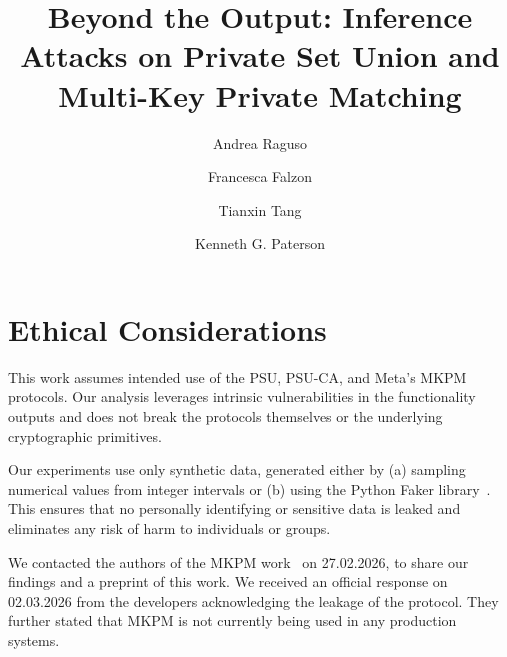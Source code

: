 \documentclass[sigconf,balance=false]{acmart}
\begin{document}
\title{Beyond the Output: Inference Attacks on Private Set Union and Multi-Key Private Matching}

\author{Andrea Raguso}

\author{Francesca Falzon}

\author{Tianxin Tang}

\author{Kenneth G. Paterson}

\renewcommand{\shortauthors}{Raguso et al.}




\maketitle











\section*{Ethical Considerations}
This work assumes intended use of the PSU, PSU-CA, and Meta’s MKPM protocols. Our analysis leverages intrinsic vulnerabilities in the functionality outputs and does not break the protocols themselves or the underlying cryptographic primitives. 

Our experiments use only synthetic data, generated either by (a) sampling numerical values from integer intervals or (b) using the Python Faker library~\cite{faker}. This ensures that no personally identifying or sensitive data is leaked and eliminates any risk of harm to individuals or groups.

We contacted the authors of the MKPM work~\cite{MKPMC} on 27.02.2026, 
to share our findings and a preprint of this work. We received an official response on 02.03.2026 from the developers acknowledging the leakage of the protocol. They further stated that MKPM is not currently being used in any production systems.
\end{document}
